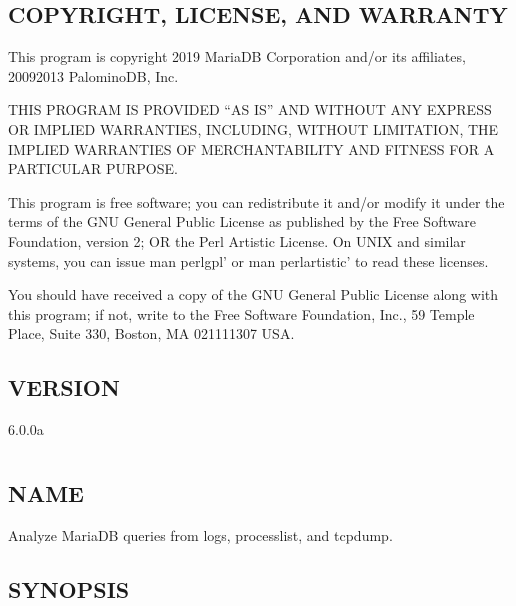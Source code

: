 \documentclass[letterpaper,10pt,english]{sphinxmanual}
\begin{document}
\section{COPYRIGHT, LICENSE, AND WARRANTY}
\label{\detokenize{mariadb-parted:copyright-license-and-warranty}}
\sphinxAtStartPar
This program is copyright 2019 MariaDB Corporation and/or its affiliates,
2009\sphinxhyphen{}2013 PalominoDB, Inc.

\sphinxAtStartPar
THIS PROGRAM IS PROVIDED “AS IS” AND WITHOUT ANY EXPRESS OR IMPLIED
WARRANTIES, INCLUDING, WITHOUT LIMITATION, THE IMPLIED WARRANTIES OF
MERCHANTABILITY AND FITNESS FOR A PARTICULAR PURPOSE.

\sphinxAtStartPar
This program is free software; you can redistribute it and/or modify it under
the terms of the GNU General Public License as published by the Free Software
Foundation, version 2; OR the Perl Artistic License.  On UNIX and similar
systems, you can issue \textasciigrave{}man perlgpl’ or \textasciigrave{}man perlartistic’ to read these
licenses.

\sphinxAtStartPar
You should have received a copy of the GNU General Public License along with
this program; if not, write to the Free Software Foundation, Inc., 59 Temple
Place, Suite 330, Boston, MA  02111\sphinxhyphen{}1307  USA.


\section{VERSION}
\label{\detokenize{mariadb-parted:version}}
\sphinxAtStartPar
{} 6.0.0a


\chapter{}
\label{\detokenize{mariadb-query-digest:mariadb-query-digest}}\label{\detokenize{mariadb-query-digest::doc}}

\section{NAME}
\label{\detokenize{mariadb-query-digest:name}}
\sphinxAtStartPar
{} \sphinxhyphen{} Analyze MariaDB queries from logs, processlist, and tcpdump.


\section{SYNOPSIS}
\label{\detokenize{mariadb-query-digest:synopsis}}
\end{document}
